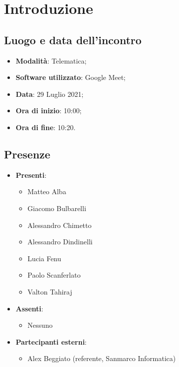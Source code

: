 \documentclass[]{article}
\begin{document}
	

	\newpage


	\section{Introduzione}
	\subsection{Luogo e data dell'incontro}
	\begin{itemize}
		\item \textbf{Modalità}: Telematica;
		\item \textbf{Software utilizzato}: Google Meet;
		\item \textbf{Data}: 29 Luglio 2021;
		\item \textbf{Ora di inizio}: 10:00;
		\item \textbf{Ora di fine}: 10:20.
	\end{itemize}

	\subsection{Presenze}
	\begin{itemize}
		\item \textbf{Presenti}:
		\begin{itemize}
			\item Matteo Alba
			\item Giacomo Bulbarelli
			\item Alessandro Chimetto
			\item Alessandro Dindinelli
			\item Lucia Fenu
			\item Paolo Scanferlato
			\item Valton Tahiraj

		\end{itemize}
		\item \textbf{Assenti}:
		\begin{itemize}
			\item Nessuno

		\end{itemize}
		\item \textbf{Partecipanti esterni}:
		\begin{itemize}
			\item Alex Beggiato (referente, Sanmarco Informatica)
		\end{itemize}
	\end{itemize}
\end{document}
